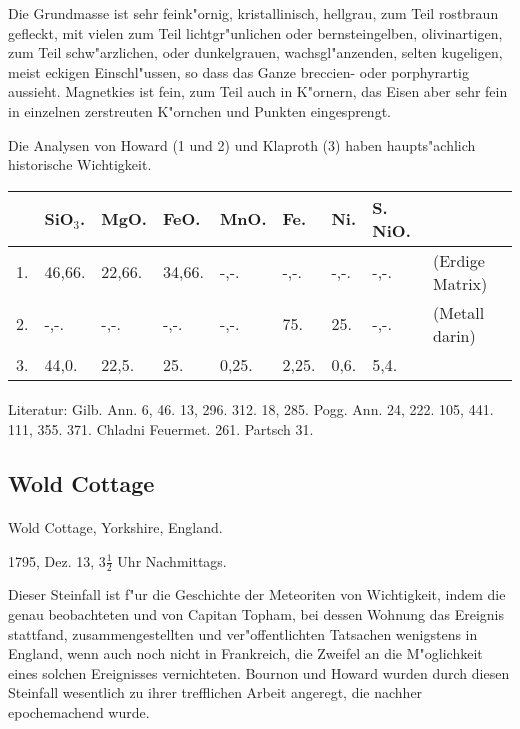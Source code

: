 \documentclass[a4paper, 11pt, oneside]{article}
\begin{document}
Die Grundmasse ist sehr feink"ornig, kristallinisch, hellgrau, zum Teil rostbraun gefleckt, mit vielen zum Teil lichtgr"unlichen oder bernsteingelben, olivinartigen, zum Teil schw"arzlichen, oder dunkelgrauen, wachsgl"anzenden, selten kugeligen, meist eckigen Einschl"ussen, so dass das Ganze breccien- oder porphyrartig aussieht. Magnetkies ist fein, zum Teil auch in K"ornern, das Eisen aber sehr fein in einzelnen zerstreuten K"ornchen und Punkten eingesprengt.

Die Analysen von Howard (1 und 2) und Klaproth (3) haben haupts"achlich historische Wichtigkeit.
\begin{table}[!ht]
    \centering
    \begin{tabular}{l l l l l l l l l}
         & SiO$_{3}$. & MgO. & FeO. & MnO. & Fe. & Ni. & S. NiO. &  \\ \hline
        1. & 46,66. & 22,66. & 34,66. & -,-. & -,-. & -,-. & -,-. & (Erdige Matrix) \\
        2. & -,-. & -,-. & -,-. & -,-. & 75. & 25. & -,-. & (Metall darin) \\
        3. & 44,0. & 22,5. & 25. & 0,25. & 2,25. & 0,6. & 5,4. &  \\
    \end{tabular}
\end{table}
\footnotesize
\paragraph{}
Literatur: Gilb. Ann. 6, 46. 13, 296. 312. 18, 285. Pogg. Ann. 24, 222. 105, 441. 111, 355. 371. Chladni Feuermet. 261. Partsch 31.
\subsection{Wold Cottage}
\normalsize
\paragraph{}
Wold Cottage, Yorkshire, England.

1795, Dez. 13, $3\frac{1}{2}$ Uhr Nachmittags.

Dieser Steinfall ist f"ur die Geschichte der Meteoriten von Wichtigkeit, indem die genau beobachteten und von Capitan Topham, bei dessen Wohnung das Ereignis stattfand, zusammengestellten und ver"offentlichten Tatsachen wenigstens in England, wenn auch noch nicht in Frankreich, die Zweifel an die M"oglichkeit eines solchen Ereignisses vernichteten. Bournon und Howard wurden durch diesen Steinfall wesentlich zu ihrer trefflichen Arbeit angeregt, die nachher epochemachend wurde.
\end{document}
